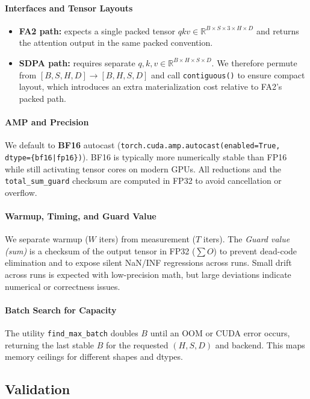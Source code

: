 \documentclass[11pt]{article}
\begin{document}
\paragraph{Interfaces and Tensor Layouts}
\begin{itemize}
\item \textbf{FA2 path:} expects a single packed tensor $qkv \in \mathbb{R}^{B \times S \times 3 \times H \times D}$ and returns the attention output in the same packed convention.
\item \textbf{SDPA path:} requires separate $q, k, v \in \mathbb{R}^{B \times H \times S \times D}$. We therefore permute from $[B,S,H,D] \rightarrow [B,H,S,D]$ and call \texttt{contiguous()} to ensure compact layout, which introduces an extra materialization cost relative to FA2’s packed path.
\end{itemize}

\paragraph{AMP and Precision}
We default to \textbf{BF16} autocast (\texttt{torch.cuda.amp.autocast(enabled=True, dtype=\{bf16|fp16\})}). BF16 is typically more numerically stable than FP16 while still activating tensor cores on modern GPUs. All reductions and the \texttt{total\_sum\_guard} checksum are computed in FP32 to avoid cancellation or overflow.

\paragraph{Warmup, Timing, and Guard Value}
We separate warmup ($W$ iters) from measurement ($T$ iters). The \emph{Guard value (sum)} is a checksum of the output tensor in FP32 ($\sum O$) to prevent dead-code elimination and to expose silent NaN/INF regressions across runs. Small drift across runs is expected with low-precision math, but large deviations indicate numerical or correctness issues.

\paragraph{Batch Search for Capacity}
The utility \texttt{find\_max\_batch} doubles $B$ until an OOM or CUDA error occurs, returning the last stable $B$ for the requested $(H,S,D)$ and backend. This maps memory ceilings for different shapes and dtypes.

\subsection{Validation}
\end{document}
